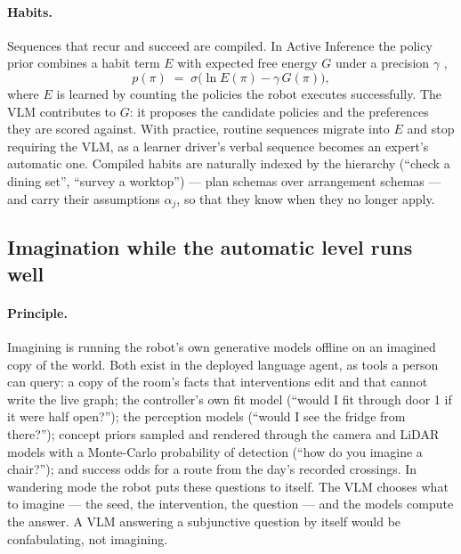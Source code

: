 \paragraph{Habits.}
Sequences that recur and succeed are compiled. In Active Inference the policy prior combines a habit term $E$ with
expected free energy $G$ under a precision $\gamma$ \cite{fitzgerald2014model, friston2016learning},
\begin{equation}
    p(\pi) \;=\; \sigma\big(\ln E(\pi) - \gamma\, G(\pi)\big),
    \label{eq:lh_habit}
\end{equation}
where $E$ is learned by counting the policies the robot executes successfully. The VLM contributes to $G$: it proposes
the candidate policies and the preferences they are scored against. With practice, routine sequences migrate into $E$
and stop requiring the VLM, as a learner driver's verbal sequence becomes an expert's automatic one. Compiled habits
are naturally indexed by the hierarchy (``check a dining set'', ``survey a worktop'') --- plan schemas over arrangement
schemas --- and carry their assumptions $\alpha_j$, so that they know when they no longer apply.

\subsection{Imagination while the automatic level runs well}
\label{sec:lang_hierarchy:imagination}

\paragraph{Principle.}
Imagining is running the robot's own generative models offline on an imagined copy of the world. Both exist in the
deployed language agent, as tools a person can query: a copy of the room's facts that interventions edit and that
cannot write the live graph; the controller's own fit model (``would I fit through door 1 if it were half open?'');
the perception models (``would I see the fridge from there?''); concept priors sampled and rendered through the
camera and LiDAR models with a Monte-Carlo probability of detection (``how do you imagine a chair?''); and success
odds for a route from the day's recorded crossings. In wandering mode the robot puts these questions to itself. The
VLM chooses what to imagine --- the seed, the intervention, the question --- and the models compute the answer. A VLM
answering a subjunctive question by itself would be confabulating, not imagining.

